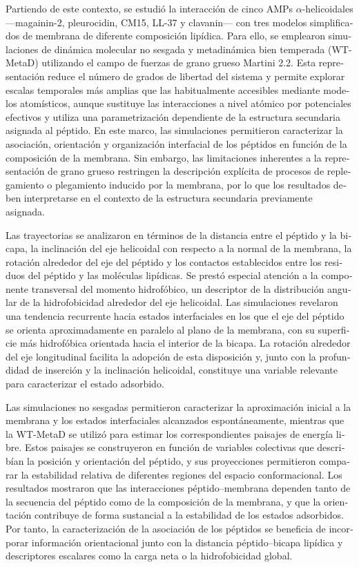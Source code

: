 \begin{otherlanguage}{spanish}
Partiendo de este contexto, se estudió la interacción de cinco AMPs $\alpha$-helicoidales ---magainin-2, pleurocidin, CM15, LL-37 y clavanin--- con tres modelos simplificados de membrana de diferente composición lipídica. Para ello, se emplearon simulaciones de dinámica molecular no sesgada y metadinámica bien temperada (WT-MetaD) utilizando el campo de fuerzas de grano grueso Martini 2.2. Esta representación reduce el número de grados de libertad del sistema y permite explorar escalas temporales más amplias que las habitualmente accesibles mediante modelos atomísticos, aunque sustituye las interacciones a nivel atómico por potenciales efectivos y utiliza una parametrización dependiente de la estructura secundaria asignada al péptido. En este marco, las simulaciones permitieron caracterizar la asociación, orientación y organización interfacial de los péptidos en función de la composición de la membrana. Sin embargo, las limitaciones inherentes a la representación de grano grueso restringen la descripción explícita de procesos de replegamiento o plegamiento inducido por la membrana, por lo que los resultados deben interpretarse en el contexto de la estructura secundaria previamente asignada.

Las trayectorias se analizaron en términos de la distancia entre el péptido y la bicapa, la inclinación del eje helicoidal con respecto a la normal de la membrana, la rotación alrededor del eje del péptido y los contactos establecidos entre los residuos del péptido y las moléculas lipídicas. Se prestó especial atención a la componente transversal del momento hidrofóbico, un descriptor de la distribución angular de la hidrofobicidad alrededor del eje helicoidal. Las simulaciones revelaron una tendencia recurrente hacia estados interfaciales en los que el eje del péptido se orienta aproximadamente en paralelo al plano de la membrana, con su superficie más hidrofóbica orientada hacia el interior de la bicapa. La rotación alrededor del eje longitudinal facilita la adopción de esta disposición y, junto con la profundidad de inserción y la inclinación helicoidal, constituye una variable relevante para caracterizar el estado adsorbido.

Las simulaciones no sesgadas permitieron caracterizar la aproximación inicial a la membrana y los estados interfaciales alcanzados espontáneamente, mientras que la WT-MetaD se utilizó para estimar los correspondientes paisajes de energía libre. Estos paisajes se construyeron en función de variables colectivas que describían la posición y orientación del péptido, y sus proyecciones permitieron comparar la estabilidad relativa de diferentes regiones del espacio conformacional. Los resultados mostraron que las interacciones péptido--membrana dependen tanto de la secuencia del péptido como de la composición de la membrana, y que la orientación contribuye de forma sustancial a la estabilidad de los estados adsorbidos. Por tanto, la caracterización de la asociación de los péptidos se beneficia de incorporar información orientacional junto con la distancia péptido--bicapa lipídica y descriptores escalares como la carga neta o la hidrofobicidad global.


\end{otherlanguage}
